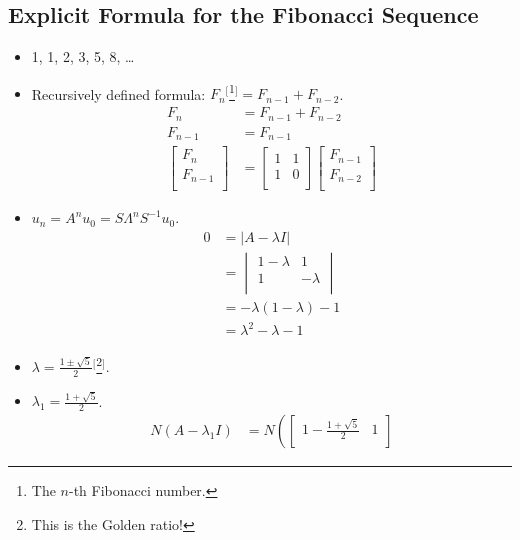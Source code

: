 \documentclass{article}
\begin{document}
\subsection*{Explicit Formula for the Fibonacci Sequence}
\begin{itemize}
    \item {}1, 1, 2, 3, 5, 8, \dots
    \item Recursively defined formula: $F_n$$^[$\footnote{The $n$-th Fibonacci number.}$^]$$=F_{n-1}+F_{n-2}$.
    \begin{align*}
        F_n &= F_{n-1}+F_{n-2}\\
        F_{n-1} &= F_{n-1}\\
        \begin{bmatrix}
            F_n\\
            F_{n-1}\\
        \end{bmatrix}
        &=
        \begin{bmatrix}
            1 & 1\\
            1 & 0\\
        \end{bmatrix}
        \begin{bmatrix}
            F_{n-1}\\
            F_{n-2}\\
        \end{bmatrix}
    \end{align*}
    \item $u_n = A^nu_0 = S\Lambda^nS^{-1}u_0$.
    \begin{align*}
        0 &= |A-\lambda I|\\
        &=
        \begin{vmatrix}
            1-\lambda & 1\\
            1 & -\lambda\\
        \end{vmatrix}\\
        &= -\lambda(1-\lambda)-1\\
        &= \lambda^2-\lambda-1
    \end{align*}
    \item $\lambda = \frac{1\pm\sqrt{5}}{2}$$^[$\footnote{This is the Golden ratio!}$^]$.
    \item $\lambda_1 = \frac{1+\sqrt{5}}{2}$.
    \begin{align*}
        N(A-\lambda_1I) &= N\left(
        \begin{bmatrix}
            1-\frac{1+\sqrt{5}}{2} & 1\\

\end{bmatrix}
\end{align*}$$
\end{itemize}
\end{document}
